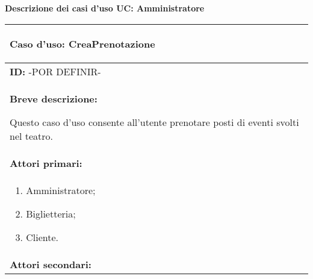 \documentclass{article}
\begin{document}
\newpage
\begin{center}
    \Large \textbf{Descrizione dei casi d'uso UC: Amministratore}
\end{center}
\newpage
\begin{table}[t]
    \centering
    \begin{tabular}{|p{\linewidth}|}
        \hline
        \cellcolor{gray!100}
        \color{white}
        \begin{center}
            \textbf{Caso d'uso:} CreaPrenotazione
        \end{center} \\
        \hline
        \textbf{ID:} -POR DEFINIR- \\
        \hline
        \cellcolor{gray!20}
		\textbf{Breve descrizione:} 
			
        Questo caso d'uso consente all'utente prenotare posti di eventi svolti nel teatro. \\
        \hline
        \textbf{Attori primari:} \\
        \begin{minipage}{\linewidth}
            \begin{enumerate}[noitemsep]
                \item Amministratore;
                \item Biglietteria;
                \item Cliente.
            \end{enumerate}
        \end{minipage}
        \vspace{0pt} \\  %
        \hline
        \textbf{Attori secondari:}
        

\end{tabular}
\end{table}
\end{document}

